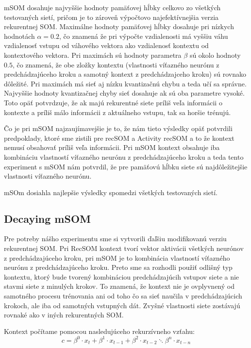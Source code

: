  mSOM dosahuje najvyššie hodnoty pamäťovej hĺbky celkovo zo všetkých testovaných sietí, pričom je to zároveň 
 výpočtovo najefektívnejšia verzia rekurentnej SOM. 
 Maximálne hodnoty pamäťovej hĺbky dosahuje pri nízkych hodnotách $\alpha = 0.2 $, čo znamená že pri výpočte vzdialenosti má vyššiu váhu vzdialenosť vstupu od 
 váhového vektora ako vzdialenosť kontextu od kontextového vektora. 
 Pri maximách sú hodnoty parametra $\beta$ sú okolo hodnoty $0.5$, čo znamená, že obe zložky kontextu 
 (vlastnosti víťazného neurónu z predchádzajúceho kroku a samotný kontext z predchádzajceho kroku) sú rovnako dôležité.
 Pri maximách má sieť aj nízku kvantizačnú chybu a teda učí sa správne. 
 Najvyššie hodnoty kvantizačnej chyby sieť dosahuje ak sú oba parametre vysoké. Toto opäť potvrdzuje, že ak majú rekurentné
 siete príliš veľa informácii o kontexte a príliš málo informácii z aktuálneho vstupu, tak sa horšie trénujú.


 Čo je pri mSOM najzaujímavejšie je to, že nám tieto výsledky opäť potvrdili predpoklady, ktoré sme zistili pre recSOM a Activity recSOM a to že
 kontext nemusí obsahovať príliš veľa informácii. Pri mSOM kontext obsahuje iba kombináciu vlastností víťazného neurónu z predchádzajúceho kroku a teda tento 
 experiment s mSOM nám potvrdil, že pre pamäťovú hĺbku siete sú najdôležitejšie vlastnosti víťazného neurónu.

 mSOm dosiahla najlepšie výsledky spomedzi všetkých testovaných sietí.



\subsection{Decaying mSOM}
Pre potreby nášho experimentu sme si vytvorili ďaľšiu modifikovanú verziu %
rekurentnej SOM. Pri RecSOM kontext tvorí vektor aktivácii všetkých neurónov z predchádzajúceho kroku, 
pri mSOM je to kombinácia vlastností víťazného neurónu z predchádzajúceho kroku. 
Preto sme sa rozhodli použiť odlišný typ kontextu, ktorý bude tvorený kombináciou predchádzajúcih vstupov 
siete a nie stavmi siete z minulých krokov. To znamená, že kontext nie je ovplyvnený od samotného procesu trénovania
ani od toho čo sa sieť naučila v predchádzajúcich krokoch, ale iba od samotných vstupných dát.
Zvyšné vlastnosti siete zostávajú rovnaké ako v iných rekurentných SOM.

Kontext počítame pomocou nasledujúceho rekurzívneho vzťahu:
\begin{equation}
	c = \beta^{0} \cdot x_{t} + \beta^{1} \cdot x_{t-1} + 
	\beta^{2} \cdot x_{t-2} \ddots \beta^{n} \cdot x_{t-n}
\end{equation}

